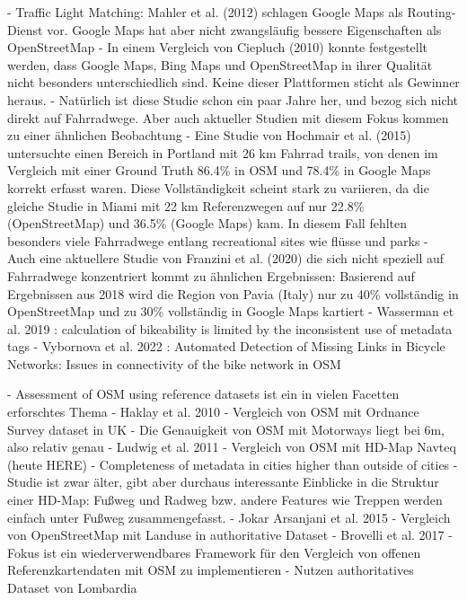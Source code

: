 - Traffic Light Matching: Mahler et al. (2012) \cite{mahler_reducing_2012} schlagen Google Maps als Routing-Dienst vor. Google Maps hat aber nicht zwangsläufig bessere Eigenschaften als OpenStreetMap
- In einem Vergleich von Ciepluch (2010) \cite{ciepluch_comparison_2010} konnte festgestellt werden, dass Google Maps, Bing Maps und OpenStreetMap in ihrer Qualität nicht besonders unterschiedlich sind. Keine dieser Plattformen sticht als Gewinner heraus.
- Natürlich ist diese Studie schon ein paar Jahre her, und bezog sich nicht direkt auf Fahrradwege. Aber auch aktueller Studien mit diesem Fokus kommen zu einer ähnlichen Beobachtung
- Eine Studie von Hochmair et al. (2015) \cite{hochmair_assessing_2015} untersuchte einen Bereich in Portland mit 26 km Fahrrad trails, von denen im Vergleich mit einer Ground Truth 86.4\% in OSM und 78.4\% in Google Maps korrekt erfasst waren. Diese Vollständigkeit scheint stark zu variieren, da die gleiche Studie in Miami mit 22 km Referenzwegen auf nur 22.8\% (OpenStreetMap) und 36.5\% (Google Maps) kam. In diesem Fall fehlten besonders viele Fahrradwege entlang recreational sites wie flüsse und parks
- Auch eine aktuellere Studie von Franzini et al. (2020) \cite{franzini_assessment_2020} die sich nicht speziell auf Fahrradwege konzentriert kommt zu ähnlichen Ergebnissen: Basierend auf Ergebnissen aus 2018 wird die Region von Pavia (Italy) nur zu 40\% vollständig in OpenStreetMap und zu 30\% vollständig in Google Maps kartiert
- Wasserman et al. 2019 \cite{wasserman_evaluating_2019}: calculation of bikeability is limited by the inconsistent use of metadata tags
- Vybornova et al. 2022 \cite{vybornova_automated_2023}: Automated Detection of Missing Links in Bicycle Networks: Issues in connectivity of the bike network in OSM

- Assessment of OSM using reference datasets ist ein in vielen Facetten erforschtes Thema
- Haklay et al. 2010 \cite{haklay_how_2010}
    - Vergleich von OSM mit Ordnance Survey dataset in UK
    - Die Genauigkeit von OSM mit Motorways liegt bei 6m, also relativ genau
- Ludwig et al. 2011 \cite{ludwig_comparison_2011}
    - Vergleich von OSM mit HD-Map Navteq (heute HERE)
    - Completeness of metadata in cities higher than outside of cities
    - Studie ist zwar älter, gibt aber durchaus interessante Einblicke in die Struktur einer HD-Map: Fußweg und Radweg bzw. andere Features wie Treppen werden einfach unter Fußweg zusammengefasst.
- Jokar Arsanjani et al. 2015 \cite{jokar_arsanjani_quality_2015}
    - Vergleich von OpenStreetMap mit Landuse in authoritative Dataset
- Brovelli et al. 2017 \cite{brovelli_towards_2017}
    - Fokus ist ein wiederverwendbares Framework für den Vergleich von offenen Referenzkartendaten mit OSM zu implementieren
    - Nutzen authoritatives Dataset von Lombardia

